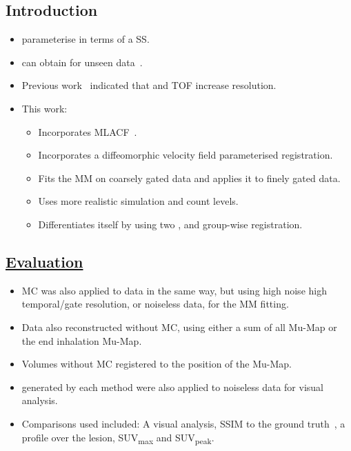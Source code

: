 \documentclass[portrait, color=UCLburgundy, margin=1cm]{uclposter}
\begin{document}
    \begin{multicols}{2}
        \section*{Introduction}
            \begin{highlightbox}[UCLlightgreen]
                \begin{itemize}
                    \item {} parameterise  in terms of a \gls{SS}.
                    \item {} can obtain  for unseen data~\cite{McClelland2013}.
                    \item Previous work~\cite{Whitehead2021ComparisonMap} indicated that  and \acrshort{TOF} increase resolution.
                    \item This work:
                    \begin{itemize}
                        \item Incorporates \acrshort{MLACF}~\cite{Nuyts2012ML-reconstructionFactors}.
                        \item Incorporates a diffeomorphic velocity field parameterised registration.
                        \item Fits the \gls{MM} on coarsely gated data and applies it to finely gated data.
                        \item Uses more realistic simulation and count levels.
                        \item Differentiates itself by using two , and group-wise registration.
                    \end{itemize}
                \end{itemize}
            \end{highlightbox}
            
        \subsection*{\underline{\textbf{Evaluation}}}
            \begin{itemize}
                \item \gls{MC} was also applied to data in the same way, but using high noise high temporal/gate resolution, or noiseless data, for the \gls{MM} fitting.
                \item Data also reconstructed without \gls{MC}, using either a sum of all \acrshort{Mu-Map} or the end inhalation \acrshort{Mu-Map}.
                \item Volumes without \gls{MC} registered to the position of the \acrshort{Mu-Map}.
                \item {} generated by each method were also applied to noiseless data for visual analysis.
                \item Comparisons used included: A visual analysis, \acrshort{SSIM} to the ground truth~\cite{Wang2009MeanMeasures}, a profile over the lesion, \acrshort{SUV}\textsubscript{max} and \acrshort{SUV}\textsubscript{peak}.
            \end{itemize}
    \end{multicols}
    
\end{document}
